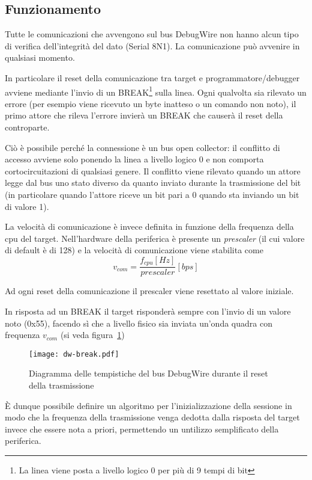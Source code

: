 \subsection{Funzionamento}

Tutte le comunicazioni che avvengono sul bus DebugWire non hanno alcun tipo di verifica dell'integrità del dato (Serial 8N1). La comunicazione può avvenire in qualsiasi momento.

In particolare il reset della comunicazione tra target e programmatore/debugger avviene mediante l'invio di un BREAK\footnote{La linea viene posta a livello logico 0 per più di 9 tempi di bit} sulla linea.
Ogni qualvolta sia rilevato un errore (per esempio viene ricevuto un byte inatteso o un comando non noto), il primo attore che rileva l'errore invierà un BREAK che causerà il reset della controparte.

Ciò è possibile perché la connessione è un bus open collector: il conflitto di accesso avviene solo ponendo la linea a livello logico 0 e non comporta cortocircuitazioni di qualsiasi genere. Il conflitto viene rilevato quando un attore legge dal bus uno stato diverso da quanto inviato durante la trasmissione del bit (in particolare quando l'attore riceve un bit pari a 0 quando sta inviando un bit di valore 1).

La velocità di comunicazione è invece definita in funzione della frequenza della cpu del target. Nell'hardware della periferica è presente un \textit{prescaler} (il cui valore di default è di 128) e la velocità di comunicazione viene stabilita come \[v_{com} = \frac{f_{cpu} [Hz]}{prescaler}[bps]\]

Ad ogni reset della comunicazione il prescaler viene resettato al valore iniziale.

In risposta ad un BREAK il target risponderà sempre con l'invio di un valore noto (0x55), facendo sì che a livello fisico sia inviata un'onda quadra con frequenza \(v_{com}\)\cite{site:dw-reverse-engeneering} (si veda figura~\ref{fig:dw-timings})

\begin{figure}[ht]
    \centering
    \texttt{[image: dw-break.pdf]}
    \caption[]{Diagramma delle tempistiche del bus DebugWire durante il reset della trasmissione}\label{fig:dw-timings}
\end{figure}

È dunque possibile definire un algoritmo per l'inizializzazione della sessione in modo che la frequenza della trasmissione venga dedotta dalla risposta del target invece che essere nota a priori, permettendo un untilizzo semplificato della periferica.

